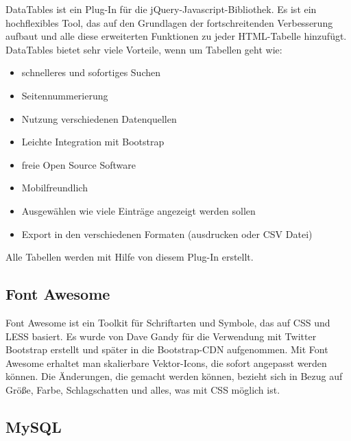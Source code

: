 DataTables ist ein Plug-In f\"{u}r die jQuery-Javascript-Bibliothek. Es ist ein hochflexibles Tool, das auf den Grundlagen der fortschreitenden Verbesserung aufbaut und alle diese erweiterten Funktionen zu jeder HTML-Tabelle hinzuf\"{u}gt. DataTables bietet sehr viele Vorteile, wenn um Tabellen geht wie: 
\begin{itemize}
	\item schnelleres und sofortiges Suchen
	\item Seitennummerierung
	\item Nutzung verschiedenen Datenquellen
	\item Leichte Integration mit Bootstrap
	\item freie Open Source Software 
	\item Mobilfreundlich
	\item Ausgewählen wie viele Einträge angezeigt werden sollen 
	\item Export in den verschiedenen Formaten (ausdrucken oder CSV Datei)
\end{itemize}

Alle Tabellen werden mit Hilfe von diesem Plug-In erstellt. \cite{40_datatables}



\subsection{Font Awesome}
Font Awesome ist ein Toolkit für Schriftarten und Symbole, das auf CSS und LESS basiert. Es wurde von Dave Gandy für die Verwendung mit Twitter Bootstrap erstellt und später in die Bootstrap-CDN aufgenommen. Mit Font Awesome erhaltet man skalierbare Vektor-Icons, die sofort angepasst werden können. Die Änderungen, die gemacht werden können, bezieht sich in Bezug auf Größe, Farbe, Schlagschatten und alles, was mit CSS möglich ist.



\subsection{MySQL}

